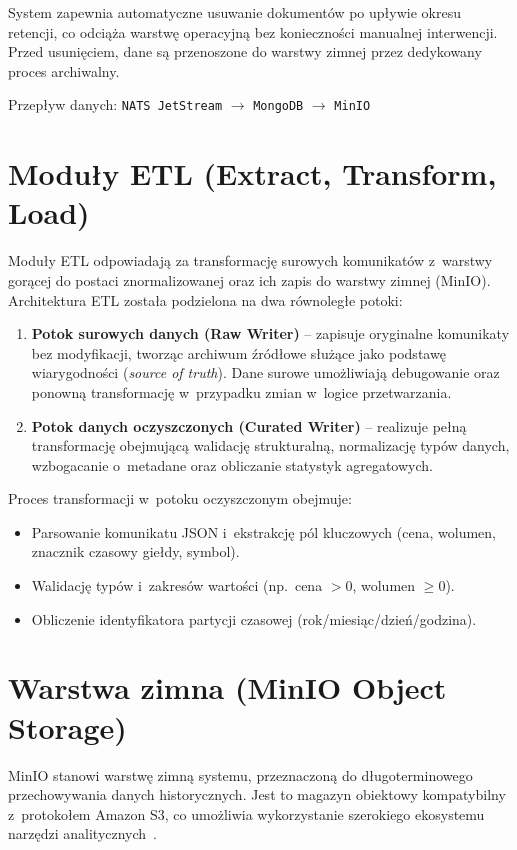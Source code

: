 System zapewnia automatyczne usuwanie dokumentów po upływie okresu retencji, co odciąża warstwę operacyjną bez
konieczności manualnej interwencji.
Przed usunięciem, dane są przenoszone do warstwy zimnej przez dedykowany proces archiwalny.

Przepływ danych: \texttt{NATS JetStream} $\rightarrow$ \texttt{MongoDB} $\rightarrow$ \texttt{MinIO}


\section{Moduły ETL (Extract, Transform, Load)}
\label{sec:etl_modules}

Moduły ETL odpowiadają za transformację surowych komunikatów z~warstwy gorącej do postaci znormalizowanej oraz ich
zapis do warstwy zimnej (MinIO).
Architektura ETL została podzielona na dwa równoległe potoki:

\begin{enumerate}
    \item \textbf{Potok surowych danych (Raw Writer)} -- zapisuje oryginalne komunikaty bez modyfikacji,
    tworząc archiwum źródłowe służące jako podstawę wiarygodności (\textit{source of truth}).
    Dane surowe umożliwiają debugowanie oraz ponowną transformację w~przypadku zmian w~logice przetwarzania.
    \item \textbf{Potok danych oczyszczonych (Curated Writer)} -- realizuje pełną transformację obejmującą
    walidację strukturalną, normalizację typów danych, wzbogacanie o~metadane oraz obliczanie statystyk agregatowych.
\end{enumerate}

Proces transformacji w~potoku oczyszczonym obejmuje:
\begin{itemize}
    \item Parsowanie komunikatu JSON i~ekstrakcję pól kluczowych (cena, wolumen, znacznik czasowy giełdy, symbol).
    \item Walidację typów i~zakresów wartości (np.\ cena $> 0$, wolumen $\geq 0$).
    \item Obliczenie identyfikatora partycji czasowej (rok/miesiąc/dzień/godzina).
\end{itemize}


\section{Warstwa zimna (MinIO Object Storage)}
\label{sec:minio}

MinIO stanowi warstwę zimną systemu, przeznaczoną do długoterminowego przechowywania danych historycznych.
Jest to magazyn obiektowy kompatybilny z~protokołem Amazon S3, co umożliwia wykorzystanie szerokiego ekosystemu
narzędzi analitycznych~\cite{minio_s3}.

